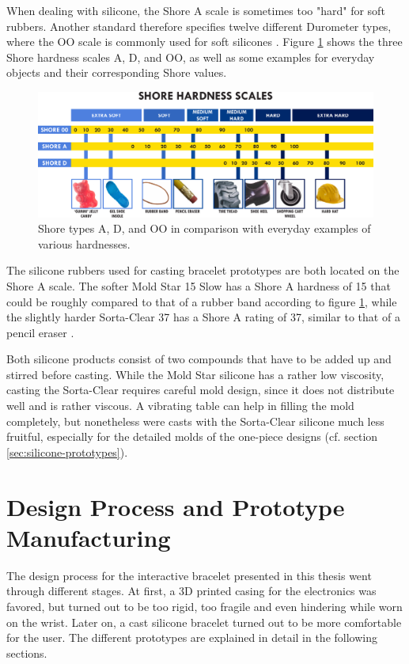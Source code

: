 When dealing with silicone, the Shore A scale is sometimes too "hard" for soft rubbers. Another standard therefore specifies twelve different Durometer types, where the OO scale is commonly used for soft silicones \cite{ISO7619}. Figure \ref{fig:shore} shows the three Shore hardness scales A, D, and OO, as well as some examples for everyday objects and their corresponding Shore values.

\begin{figure}[bth]
	\includegraphics[width=\linewidth]{gfx/durometer_without_logo.pdf}
	\caption[Shore hardness scales and everyday examples]{Shore types A, D, and OO in comparison with everyday examples of various hardnesses. \cite{smoothon-web}}\label{fig:shore}
\end{figure}

The silicone rubbers used for casting bracelet prototypes are both located on the Shore A scale. The softer Mold Star 15 Slow has a Shore A hardness of 15 that could be roughly compared to that of a rubber band according to figure \ref{fig:shore}, while the slightly harder Sorta-Clear 37 has a Shore A rating of 37, similar to that of a pencil eraser \cite{moldstar} \cite{sortaclear}.

Both silicone products consist of two compounds that have to be added up and stirred before casting. While the Mold Star silicone has a rather low viscosity, casting the Sorta-Clear requires careful mold design, since it does not distribute well and is rather viscous. A vibrating table can help in filling the mold completely, but nonetheless were casts with the Sorta-Clear silicone much less fruitful, especially for the detailed molds of the one-piece designs (cf. section \ref{sec:silicone-prototypes}).

\section{Design Process and Prototype Manufacturing}

The design process for the interactive bracelet presented in this thesis went through different stages. At first, a 3D printed casing for the electronics was favored, but turned out to be too rigid, too fragile and even hindering while worn on the wrist. Later on, a cast silicone bracelet turned out to be more comfortable for the user. The different prototypes are explained in detail in the following sections.

